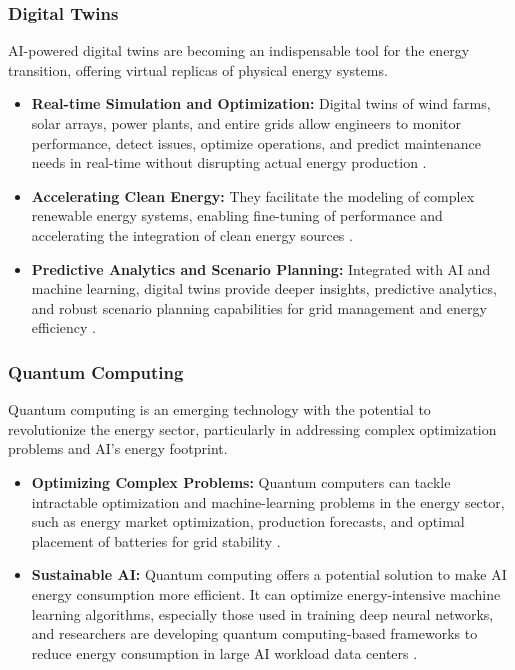\subsubsection{Digital Twins}
AI-powered digital twins are becoming an indispensable tool for the energy transition, offering virtual replicas of physical energy systems.
\begin{itemize}
    \item \textbf{Real-time Simulation and Optimization:} Digital twins of wind farms, solar arrays, power plants, and entire grids allow engineers to monitor performance, detect issues, optimize operations, and predict maintenance needs in real-time without disrupting actual energy production \cite{OpenAccessGov_DigitalTwins, EnergyCentral_DigitalTwins}.
    \item \textbf{Accelerating Clean Energy:} They facilitate the modeling of complex renewable energy systems, enabling fine-tuning of performance and accelerating the integration of clean energy sources \cite{OpenAccessGov_DigitalTwins, FutureDigitalTwin_DigitalTwins}.
    \item \textbf{Predictive Analytics and Scenario Planning:} Integrated with AI and machine learning, digital twins provide deeper insights, predictive analytics, and robust scenario planning capabilities for grid management and energy efficiency \cite{ICF_DigitalTwins, FacultyAI_DigitalTwins}.
\end{itemize}

\subsubsection{Quantum Computing}
Quantum computing is an emerging technology with the potential to revolutionize the energy sector, particularly in addressing complex optimization problems and AI's energy footprint.
\begin{itemize}
    \item \textbf{Optimizing Complex Problems:} Quantum computers can tackle intractable optimization and machine-learning problems in the energy sector, such as energy market optimization, production forecasts, and optimal placement of batteries for grid stability \cite{QuantumComputingReport_Quantum, EETimes_Quantum}.
    \item \textbf{Sustainable AI:} Quantum computing offers a potential solution to make AI energy consumption more efficient. It can optimize energy-intensive machine learning algorithms, especially those used in training deep neural networks, and researchers are developing quantum computing-based frameworks to reduce energy consumption in large AI workload data centers \cite{Netsqure_Quantum, SmartEnergy_Quantum}.
\end{itemize}

